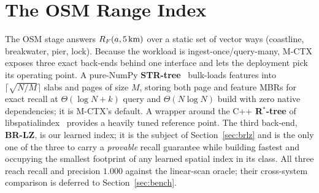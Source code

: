 \section{The OSM Range Index}\label{sec:osm}

The OSM stage answers $R_F(a,5\text{\,km})$ over a static set of vector
ways (coastline, breakwater, pier, lock). Because the workload is
ingest-once/query-many, M-CTX exposes three exact back-ends behind one
interface and lets the deployment pick its operating point. A pure-NumPy
\textbf{STR-tree}~\cite{leutenegger1997str} bulk-loads features into
$\lceil\sqrt{N/M}\rceil$ slabs and pages of size $M$, storing both page
and feature MBRs for exact recall at $\Theta(\log N+k)$ query and
$\Theta(N\log N)$ build with zero native dependencies; it is M-CTX's
default. A wrapper around the C++ \textbf{R$^{*}$-tree} of
libspatialindex~\cite{libspatialindex} provides a heavily tuned reference
point. The third back-end, \textbf{BR-LZ}, is our learned index; it is
the subject of Section~\ref{sec:brlz} and is the only one of the three to
carry a \emph{provable} recall guarantee while building fastest and
occupying the smallest footprint of any learned spatial index in its
class. All three reach recall and precision $1.000$ against the
linear-scan oracle; their cross-system comparison is deferred to
Section~\ref{sec:bench}.
